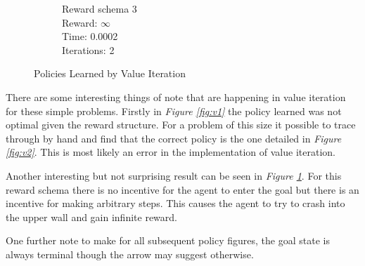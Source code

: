 \documentclass[a4paper,10pt]{article}
\begin{document}
\begin{figure}[H]
\begin{subfigure}[b]{0.3\textwidth}
                \caption{Reward schema 3\\
                Reward: $\infty$  \\
                Time:  0.0002\\
                Iterations: 2}
                \label{fig:v3}
        \end{subfigure}
        \caption{Policies Learned by Value Iteration}\label{fig:smallval}
\end{figure}
There are some interesting things of note that are happening in value iteration for these simple problems. Firstly in \textit{Figure \ref{fig:v1}} the policy learned was not optimal given the reward structure. For a problem of this size it  possible to trace through by hand and find that the correct policy is the one detailed in \textit{Figure \ref{fig:v2}}. This is most likely an error in the implementation of value iteration.

Another interesting but not surprising result can be seen in  \textit{Figure \ref{fig:v3}}. For this reward schema there is no incentive for the agent to enter the goal but there is an incentive for making arbitrary steps. This causes the agent to try to crash into the upper wall and gain infinite reward.

One further note to make for all subsequent policy figures, the goal state is always terminal though the arrow may suggest otherwise.
\end{document}
